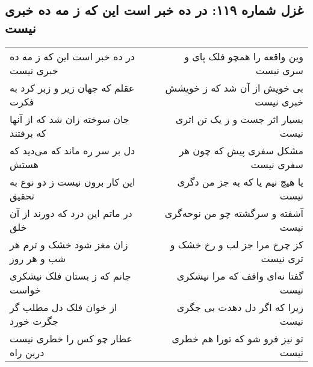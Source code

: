 \begin{center}
\section*{غزل شماره ۱۱۹: در ده خبر است این که ز مه ده خبری نیست}
\label{sec:119}
\begin{longtable}{l p{0.5cm} r}
در ده خبر است این که ز مه ده خبری نیست
&&
وین واقعه را همچو فلک پای و سری نیست
\\
عقلم که جهان زیر و زبر کرد به فکرت
&&
بی خویش از آن شد که ز خویشش خبری نیست
\\
جان سوخته زان شد که از آنها که برفتند
&&
بسیار اثر جست و ز یک تن اثری نیست
\\
دل بر سر ره ماند که می‌دید که هستش
&&
مشکل سفری پیش که چون هر سفری نیست
\\
این کار برون نیست ز دو نوع به تحقیق
&&
یا هیچ نیم یا که به جز من دگری نیست
\\
در ماتم این درد که دورند از آن خلق
&&
آشفته و سرگشته چو من نوحه‌گری نیست
\\
زان مغز شود خشک و ترم هر شب و هر روز
&&
کز چرخ مرا جز لب و رخ خشک و تری نیست
\\
جانم که ز بستان فلک نیشکری خواست
&&
گفتا نه‌ای واقف که مرا نیشکری نیست
\\
از خوان فلک دل مطلب گر جگرت خورد
&&
زیرا که اگر دل دهدت بی جگری نیست
\\
عطار چو کس را خطری نیست درین راه
&&
تو نیز فرو شو که تورا هم خطری نیست
\\
\end{longtable}
\end{center}
